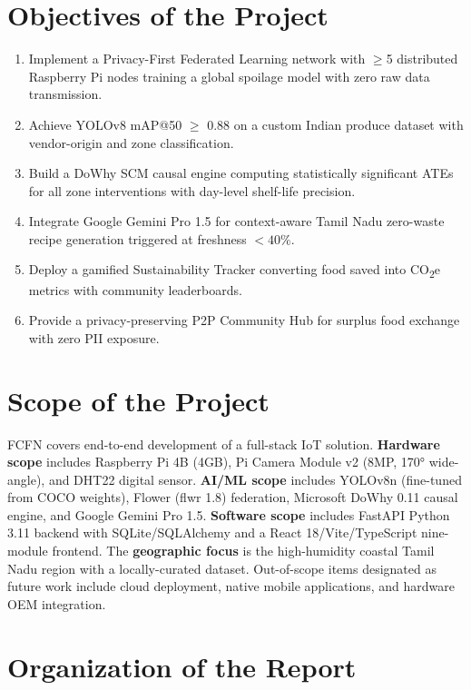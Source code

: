 \documentclass[12pt,a4paper]{report}
\begin{document}
\section{Objectives of the Project}

\begin{enumerate}[leftmargin=2em, itemsep=0.3em]
    \item Implement a Privacy-First Federated Learning network with $\geq$5 distributed Raspberry Pi nodes training a global spoilage model with zero raw data transmission.
    \item Achieve YOLOv8 mAP@50 $\geq$ 0.88 on a custom Indian produce dataset with vendor-origin and zone classification.
    \item Build a DoWhy SCM causal engine computing statistically significant ATEs for all zone interventions with day-level shelf-life precision.
    \item Integrate Google Gemini Pro 1.5 for context-aware Tamil Nadu zero-waste recipe generation triggered at freshness $< 40\%$.
    \item Deploy a gamified Sustainability Tracker converting food saved into CO\textsubscript{2}e metrics with community leaderboards.
    \item Provide a privacy-preserving P2P Community Hub for surplus food exchange with zero PII exposure.
\end{enumerate}

\section{Scope of the Project}

FCFN covers end-to-end development of a full-stack IoT solution. \textbf{Hardware scope} includes Raspberry Pi 4B (4GB), Pi Camera Module v2 (8MP, 170° wide-angle), and DHT22 digital sensor. \textbf{AI/ML scope} includes YOLOv8n (fine-tuned from COCO weights), Flower (flwr 1.8) federation, Microsoft DoWhy 0.11 causal engine, and Google Gemini Pro 1.5. \textbf{Software scope} includes FastAPI Python 3.11 backend with SQLite/SQLAlchemy and a React 18/Vite/TypeScript nine-module frontend. The \textbf{geographic focus} is the high-humidity coastal Tamil Nadu region with a locally-curated dataset. Out-of-scope items designated as future work include cloud deployment, native mobile applications, and hardware OEM integration.

\section{Organization of the Report}
\end{document}
